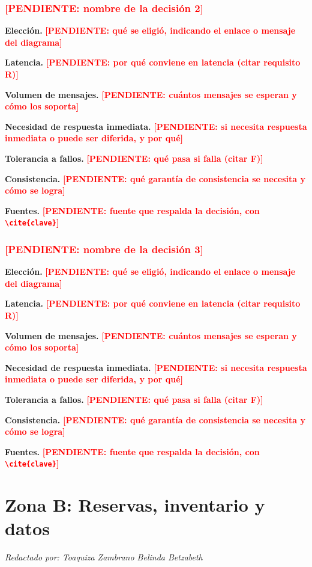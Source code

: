 \documentclass[11pt,a4paper]{article}
\newcommand{\pendiente}[1]{\textbf{\textcolor{red}{[PENDIENTE: #1]}}}
\newcommand{\autor}[1]{\par{\small\textit{Redactado por: #1}}\par}
\newcommand{\decision}[8]{\subsubsection*{#1}%
  \textbf{Elección.} #2\par
  \textbf{Latencia.} #3\par
  \textbf{Volumen de mensajes.} #4\par
  \textbf{Necesidad de respuesta inmediata.} #5\par
  \textbf{Tolerancia a fallos.} #6\par
  \textbf{Consistencia.} #7\par
  \textbf{Fuentes.} #8\par}
\newcommand{\integranteB}{Toaquiza Zambrano Belinda Betzabeth}
\begin{document}
\decision{\pendiente{nombre de la decisión 2}}
 {\pendiente{qué se eligió, indicando el enlace o mensaje del diagrama}}
 {\pendiente{por qué conviene en latencia (citar requisito R)}}
 {\pendiente{cuántos mensajes se esperan y cómo los soporta}}
 {\pendiente{si necesita respuesta inmediata o puede ser diferida, y por qué}}
 {\pendiente{qué pasa si falla (citar F)}}
 {\pendiente{qué garantía de consistencia se necesita y cómo se logra}}
 {\pendiente{fuente que respalda la decisión, con \texttt{\textbackslash cite\{clave\}}}}

\decision{\pendiente{nombre de la decisión 3}}
 {\pendiente{qué se eligió, indicando el enlace o mensaje del diagrama}}
 {\pendiente{por qué conviene en latencia (citar requisito R)}}
 {\pendiente{cuántos mensajes se esperan y cómo los soporta}}
 {\pendiente{si necesita respuesta inmediata o puede ser diferida, y por qué}}
 {\pendiente{qué pasa si falla (citar F)}}
 {\pendiente{qué garantía de consistencia se necesita y cómo se logra}}
 {\pendiente{fuente que respalda la decisión, con \texttt{\textbackslash cite\{clave\}}}}

\section{Zona B: Reservas, inventario y datos}\label{sec:zonaB}
\autor{\integranteB}
\end{document}
